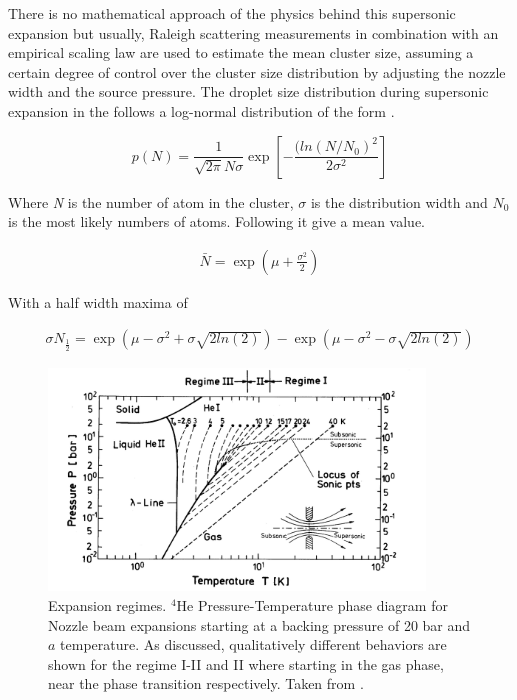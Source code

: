 There is no mathematical approach of the physics behind this supersonic expansion but usually, Raleigh scattering measurements in combination with an empirical scaling law \cite{hagena_cluster_1972} are used to estimate the mean cluster size, assuming a certain degree of control over the cluster size distribution by adjusting the nozzle width and the source pressure. The droplet size distribution during supersonic expansion in the follows a log-normal distribution of the form \cite{harms_density_1998}.

\begin{equation}
p(N) = \frac{1}{\sqrt{2\pi}N \sigma} \exp  \left[- \frac{(ln(N/N_{0})^2}{2\sigma^2} \right]
\end{equation}

Where \textit{N} is the number of atom in the cluster, $\sigma$ is the distribution width and \textit{$N_{0}$} is the most likely numbers of atoms. Following it give a mean value.

\begin{align}
\bar N = \exp  \left(\mu+\frac{\sigma^2}{2} \right)
\end{align}

With a half width maxima of \cite{harms_density_1998}

\begin{align}
\sigma N_{\frac{1}{2}} = \exp \left( \mu - \sigma ^2 + \sigma \sqrt{2 ln(2)} \right) - \exp \left(  \mu - \sigma ^2 - \sigma \sqrt{2 ln(2)}  \right)
\end{align}

\begin{figure}[h!] \label{fig:ExpRegim}
\centering
\includegraphics[width= 10cm]{../Images/expansion_regimes.PNG}
\caption[Phase diagram for Expansion regimens]{Expansion regimes. $^{4}$He Pressure-Temperature phase diagram for Nozzle beam expansions starting at a backing pressure  of 20 bar and $a$ temperature. As discussed, qualitatively different behaviors are shown for the regime I-II and II where starting in the gas phase,  near the phase transition respectively. Taken from \cite{buchenau_mass_1990}. }
\end{figure}

